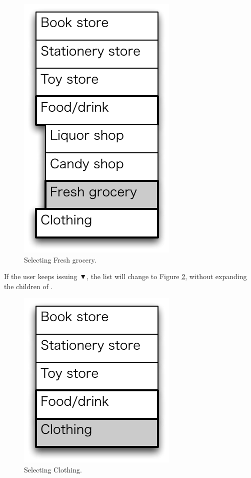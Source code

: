 \documentclass[conference]{IEEEtran}
\def\down{▼}
\begin{document}
\begin{figure}[H]
\centerline{\includegraphics[width=\menuwidth,bb=0 0 139 238]{figures/fig6.pdf}}
\caption{Selecting Fresh grocery.}
\label{fig6}
\end{figure}

If the user keeps issuing {\down}, 
the list will change to Figure \ref{fig8},
without expanding the children of .

\begin{figure}[H]
\centerline{\includegraphics[width=\menuwidth,bb=0 0 139 157]{figures/fig8.pdf}}
\caption{Selecting Clothing.}
\label{fig8}
\end{figure}
\end{document}
